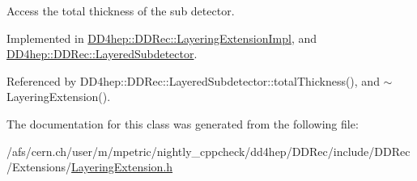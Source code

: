 Access the total thickness of the sub detector. 



Implemented in \hyperlink{class_d_d4hep_1_1_d_d_rec_1_1_layering_extension_impl_a8981b8aa172e91e8a3f1fa490030a06c}{D\+D4hep\+::\+D\+D\+Rec\+::\+Layering\+Extension\+Impl}, and \hyperlink{class_d_d4hep_1_1_d_d_rec_1_1_layered_subdetector_a0a47efb56ee534813273f42808502921}{D\+D4hep\+::\+D\+D\+Rec\+::\+Layered\+Subdetector}.



Referenced by D\+D4hep\+::\+D\+D\+Rec\+::\+Layered\+Subdetector\+::total\+Thickness(), and $\sim$\+Layering\+Extension().



The documentation for this class was generated from the following file\+:\begin{DoxyCompactItemize}
\item 
/afs/cern.\+ch/user/m/mpetric/nightly\+\_\+cppcheck/dd4hep/\+D\+D\+Rec/include/\+D\+D\+Rec/\+Extensions/\hyperlink{_layering_extension_8h}{Layering\+Extension.\+h}\end{DoxyCompactItemize}
